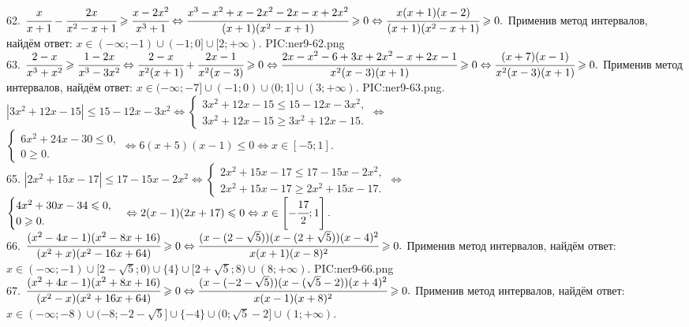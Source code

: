 62. $\cfrac{x}{x+1}-\cfrac{2x}{x^2-x+1}\geqslant\cfrac{x-2x^2}{x^3+1}\Leftrightarrow \cfrac{x^3-x^2+x-2x^2-2x-x+2x^2}{(x+1)(x^2-x+1)}\geqslant0
\Leftrightarrow \cfrac{x(x+1)(x-2)}{(x+1)(x^2-x+1)}\geqslant0.$ Применив метод интервалов, найдём ответ: $x\in (-\infty;-1)\cup(-1;0]\cup[2;+\infty).$
{{PIC:ner9-62.png}}\\
63. $\cfrac{2-x}{x^3+x^2}\geqslant\cfrac{1-2x}{x^3-3x^2}\Leftrightarrow\cfrac{2-x}{x^2(x+1)}+\cfrac{2x-1}{x^2(x-3)}\geqslant0\Leftrightarrow
\cfrac{2x-x^2-6+3x+2x^2-x+2x-1}{x^2(x-3)(x+1)}\geqslant0\Leftrightarrow\cfrac{(x+7)(x-1)}{x^2(x-3)(x+1)}\geqslant0.$ Применив метод интервалов, найдём ответ: $x\in
(-\infty;-7]\cup(-1;0)\cup(0;1]\cup(3;+\infty).$
{{PIC:ner9-63.png}}\newpage{}. $|3x^2+12x-15|\leqslant15-12x-3x^2\Leftrightarrow\begin{cases}3x^2+12x-15\leqslant15-12x-3x^2,\\3x^2+12x-15\geqslant3x^2+12x-15.\end{cases}
\Leftrightarrow$\\$\begin{cases}6x^2+24x-30\leqslant0,\\0\geqslant0.\end{cases}\Leftrightarrow 6(x+5)(x-1)\leqslant0\Leftrightarrow x\in[-5;1].$\\
65. $|2x^2+15x-17|\leqslant17-15x-2x^2\Leftrightarrow\begin{cases}2x^2+15x-17\leqslant17-15x-2x^2,\\2x^2+15x-17\geqslant2x^2+15x-17.\end{cases}
\Leftrightarrow$\\$\begin{cases}4x^2+30x-34\leqslant0,\\0\geqslant0.\end{cases}\Leftrightarrow 2(x-1)(2x+17)\leqslant0\Leftrightarrow x\in\left[-\cfrac{17}{2};1\right].$\\
66. $\cfrac{(x^2-4x-1)(x^2-8x+16)}{(x^2+x)(x^2-16x+64)}\geqslant0\Leftrightarrow
\cfrac{(x-(2-\sqrt{5}))(x-(2+\sqrt{5}))(x-4)^2}{x(x+1)(x-8)^2}\geqslant0.$ Применив метод интервалов, найдём ответ: $x\in
(-\infty;-1)\cup[2-\sqrt{5};0)\cup\{4\}\cup[2+\sqrt{5};8)\cup(8;+\infty).$
{{PIC:ner9-66.png}}\\
67. $\cfrac{(x^2+4x-1)(x^2+8x+16)}{(x^2-x)(x^2+16x+64)}\geqslant0\Leftrightarrow
\cfrac{(x-(-2-\sqrt{5}))(x-(\sqrt{5}-2))(x+4)^2}{x(x-1)(x+8)^2}\geqslant0.$ Применив метод интервалов, найдём ответ: $x\in
(-\infty;-8)\cup(-8;-2-\sqrt{5}]\cup\{-4\}\cup(0;\sqrt{5}-2]\cup(1;+\infty).$

